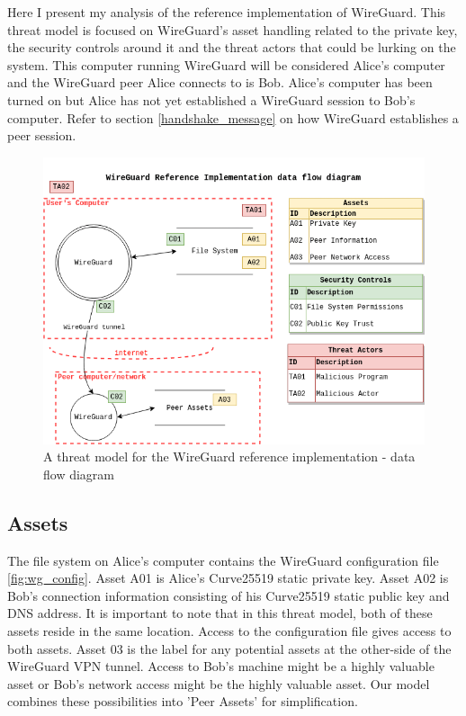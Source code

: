 \documentclass [11pt, proquest] {uwthesis}[2020/02/24]
\begin{document}
Here I present my analysis of the reference implementation of WireGuard. This threat model is focused on WireGuard's asset handling related to the private key, the security controls around it and the threat actors that could be lurking on the system. This computer running WireGuard will be considered Alice's computer and the WireGuard peer Alice connects to is Bob. Alice's computer has been turned on but Alice has not yet established a WireGuard session to Bob's computer. Refer to section \ref{handshake_message} on how WireGuard establishes a peer session. 

\begin{figure}[ht]
\includegraphics[width=14cm]{paper/images/WG_DFD.drawio.png}
\caption{A threat model for the WireGuard reference implementation - data flow diagram}
\label{fig:wg_ref_dfd}
\end{figure}

\subsection{Assets}
The file system on Alice's computer contains the WireGuard configuration file \ref{fig:wg_config}. 
Asset A01 is Alice's Curve25519 static private key. Asset A02 is Bob's connection information consisting of his Curve25519 static public key and DNS address. It is important to note that in this threat model, both of these assets reside in the same location. Access to the configuration file gives access to both assets.
Asset 03 is the label for any potential assets at the other-side of the WireGuard VPN tunnel. Access to Bob's machine might be a highly valuable asset or Bob's network access might be the highly valuable asset. Our model combines these possibilities into 'Peer Assets' for simplification.
\end{document}
